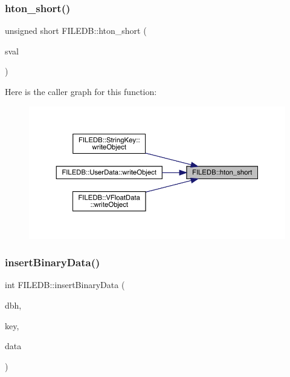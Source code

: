 \mbox{\label{namespaceFILEDB_acbb57ab648e150c1950a7e6a67a6aa56}} 
\subsubsection{\texorpdfstring{hton\_short()}{hton\_short()}}
{\footnotesize\ttfamily unsigned short F\+I\+L\+E\+D\+B\+::hton\+\_\+short (\begin{DoxyParamCaption}\item[{unsigned short}]{sval }\end{DoxyParamCaption})}

Here is the caller graph for this function\+:
\nopagebreak
\begin{figure}[H]
\begin{center}
\leavevmode
\includegraphics[width=350pt]{d2/de6/namespaceFILEDB_acbb57ab648e150c1950a7e6a67a6aa56_icgraph}
\end{center}
\end{figure}
\mbox{\label{namespaceFILEDB_a517749615adc5aa798175fb429115366}} 
\subsubsection{\texorpdfstring{insertBinaryData()}{insertBinaryData()}}
{\footnotesize\ttfamily int F\+I\+L\+E\+D\+B\+::insert\+Binary\+Data (\begin{DoxyParamCaption}\item[{\mbox{\hyperlink{adat-devel_2other__libs_2filedb_2filehash_2ffdb__db_8h_a0b27b956926453a7a8141ea8e10f0df8}{F\+F\+D\+B\+\_\+\+DB}} $\ast$}]{dbh,  }\item[{const std\+::string \&}]{key,  }\item[{const std\+::string \&}]{data }\end{DoxyParamCaption})}


